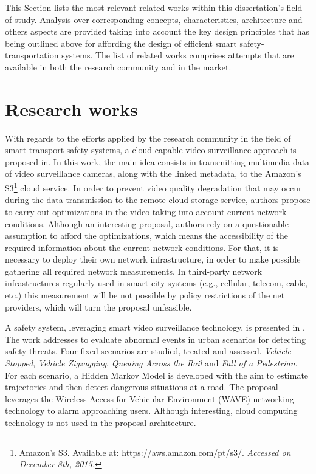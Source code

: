 This Section lists the most relevant related works within this dissertation's field of study. Analysis over corresponding concepts, characteristics, architecture and others aspects are provided taking into account the key design principles that has being outlined above for affording the design of efficient smart safety-transportation systems. The list of related works comprises attempts that are available in both the research community and in the market.

\section{Research works}

With regards to the efforts applied by the research community in the field of smart transport-safety systems, a cloud-capable video surveillance approach is proposed in\cite{Rodriguez2012}. In this work, the main idea consists in transmitting multimedia data of video surveillance cameras, along with the linked metadata, to the Amazon's S3\footnote[9]{Amazon's S3. Available at: https://aws.amazon.com/pt/s3/. \textit{Accessed on December 8th, 2015.}} cloud service. In order to prevent video quality degradation that may occur during the data transmission to the remote cloud storage service, authors propose to carry out optimizations in the video taking into account current network conditions. Although an interesting proposal, authors rely on a questionable assumption to afford the optimizations, which means the accessibility of the required information about the current network conditions. For that, it is necessary to deploy their own network infrastructure, in order to make possible gathering all required network measurements. In third-party network infrastructures regularly used in smart city systems (e.g., cellular, telecom, cable, etc.) this measurement will be not possible by policy restrictions of the net providers, which will turn the proposal unfeasible. 

A safety system, leveraging smart video surveillance technology, is presented in \cite{salmane2015}. The work addresses to evaluate abnormal events in urban scenarios for detecting safety threats. Four fixed scenarios are studied, treated and assessed. \textit{Vehicle Stopped}, \textit{Vehicle Zigzagging}, \textit{Queuing Across the Rail} and \textit{Fall of a Pedestrian}. For each scenario, a Hidden Markov Model is developed with the aim to estimate trajectories and then detect dangerous situations at a road.  The proposal leverages the Wireless Access for Vehicular Environment (WAVE) networking technology to alarm approaching users. Although interesting, cloud computing technology is not used in the proposal architecture. 

